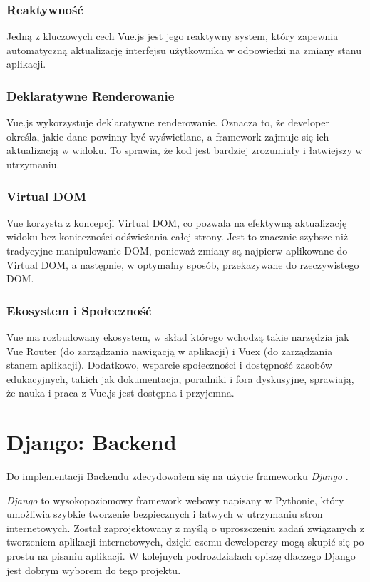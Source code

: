 \subsubsection*{Reaktywność}

Jedną z kluczowych cech Vue.js jest jego reaktywny system, który zapewnia automatyczną aktualizację interfejsu użytkownika w odpowiedzi na zmiany stanu aplikacji. 

\subsubsection*{Deklaratywne Renderowanie}

Vue.js wykorzystuje deklaratywne renderowanie. Oznacza to, że developer określa, jakie dane powinny być wyświetlane, a framework zajmuje się ich aktualizacją w widoku. To sprawia, że kod jest bardziej zrozumiały i łatwiejszy w utrzymaniu.

\subsubsection*{Virtual DOM}

Vue korzysta z koncepcji Virtual DOM, co pozwala na efektywną aktualizację widoku bez konieczności odświeżania całej strony. Jest to znacznie szybsze niż tradycyjne manipulowanie DOM, ponieważ zmiany są najpierw aplikowane do Virtual DOM, a następnie, w optymalny sposób, przekazywane do rzeczywistego DOM.

\subsubsection*{Ekosystem i Społeczność}

Vue ma rozbudowany ekosystem, w skład którego wchodzą takie narzędzia jak Vue Router (do zarządzania nawigacją w aplikacji) i Vuex (do zarządzania stanem aplikacji). Dodatkowo, wsparcie społeczności i dostępność zasobów edukacyjnych, takich jak dokumentacja, poradniki i fora dyskusyjne, sprawiają, że nauka i praca z Vue.js jest dostępna i przyjemna.


\newpage
\section{Django: Backend}

Do implementacji Backendu zdecydowałem się na użycie frameworku \textit{Django} \cite{django}.

\textit{Django} to wysokopoziomowy framework webowy napisany w Pythonie, który umożliwia szybkie tworzenie bezpiecznych i łatwych w utrzymaniu stron internetowych. Został zaprojektowany z myślą o uproszczeniu zadań związanych z tworzeniem aplikacji internetowych, dzięki czemu deweloperzy mogą skupić się po prostu na pisaniu aplikacji. W kolejnych podrozdziałach opiszę dlaczego Django jest dobrym wyborem do tego projektu.


